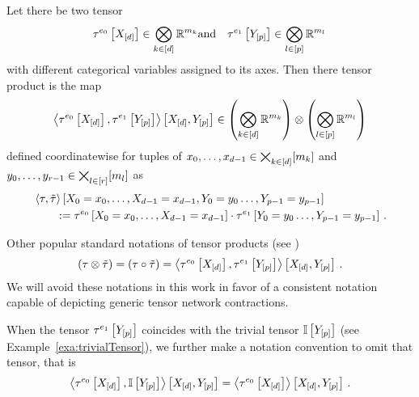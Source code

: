 \begin{definition}\label{def:tensorProduct}
	Let there be two tensor
	\begin{align*}
		\tau^{e_0}\left[X_{[d]}\right] \in \bigotimes_{k\in[d]} \mathbb{R}^{m_{k}}  \text{and} \quad  \tau^{e_1}\left[Y_{[p]}\right] \in \bigotimes_{l\in[p]} \mathbb{R}^{m_{l}} \,
	\end{align*}
	with different categorical variables assigned to its axes.
	Then there tensor product is the map
	\begin{align*}
		\left\langle \tau^{e_0}\left[X_{[d]}\right],\tau^{e_1}\left[Y_{[p]}\right]\right\rangle \left[ X_{[d]},Y_{[p]} \right]
		\in \left(\bigotimes_{k\in[d]} \mathbb{R}^{m_{k}}\right) \otimes \left(\bigotimes_{l\in[p]} \mathbb{R}^{m_{l}} \right)
	\end{align*}
	defined coordinatewise for tuples of $x_{0},\ldots,x_{d-1}\in\bigtimes_{k\in[d]}[m_{k}]$ and ${y_{0},\ldots,y_{r-1}}\in\bigtimes_{l\in[r]}[m_{l}]$ as
	\begin{align*}
		& \left\langle \tau,\tilde{\tau}\right\rangle \left[ X_{0}=x_{0},\ldots,X_{d-1}=x_{d-1},Y_{0}=y_{0}\ldots,Y_{p-1}=y_{p-1} \right] \\
		&\quad\quad :=  \tau^{e_0}\left[X_{0}=x_{0},\ldots,X_{d-1}=x_{d-1}\right]\cdot \tau^{e_1}\left[Y_{0}=y_{0}\ldots,Y_{p-1}=y_{p-1}\right] \, .
	\end{align*}
\end{definition}

Other popular standard notations of tensor products (see \cite{kolda_tensor_2009,hackbusch_tensor_2012,cichocki_tensor_2015})
	\[ \left(\tau \otimes \tilde{\tau}\right) = \left(\tau \circ \tilde{\tau}\right)
	= \left\langle \tau^{e_0}\left[X_{[d]}\right],\tau^{e_1}\left[Y_{[p]}\right]\right\rangle \left[ X_{[d]},Y_{[p]} \right]  \, . \]
We will avoid these notations in this work in favor of a consistent notation capable of depicting generic tensor network contractions.

When the tensor $\tau^{e_1}\left[Y_{[p]}\right]$ coincides with the trivial tensor $\mathbb{I}\left[Y_{[p]}\right]$ (see Example~\ref{exa:trivialTensor}), we further make a notation convention to omit that tensor, that is
\begin{align*}
	\left\langle \tau^{e_0}\left[X_{[d]}\right],\mathbb{I}\left[Y_{[p]}\right]\right\rangle \left[ X_{[d]},Y_{[p]} \right]
	= \left\langle \tau^{e_0}\left[X_{[d]}\right]\right\rangle \left[ X_{[d]},Y_{[p]} \right] \, .
\end{align*}


